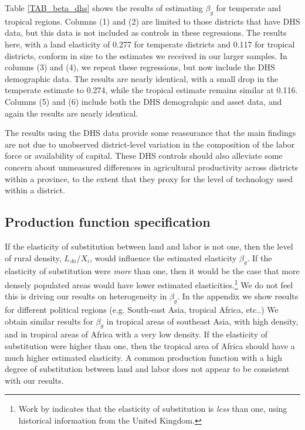 \documentclass[11pt]{article}
\begin{document}
Table \ref{TAB_beta_dhs} shows the results of estimating $\beta_g$ for temperate and tropical regions. Columns (1) and (2) are limited to those districts that have DHS data, but this data is not included as controls in these regressions. The results here, with a land elasticity of 0.277 for temperate districts and 0.117 for tropical districts, conform in size to the estimates we received in our larger samples. In columns (3) and (4), we repeat these regressions, but now include the DHS demographic data. The results are nearly identical, with a small drop in the temperate estimate to 0.274, while the tropical estimate remains similar at 0.116. Columns (5) and (6) include both the DHS demograhpic and asset data, and again the results are nearly identical. 

The results using the DHS data provide some reassurance that the main findings are not due to unobserved district-level variation in the composition of the labor force or availability of capital. These DHS controls should also alleviate some concern about unmeasured differences in agricultural productivity across districts within a province, to the extent that they proxy for the level of technology used within a district.

\subsection{Production function specification}
If the elasticity of substitution between land and labor is not one, then the level of rural density, $L_{Ai}/X_i$, would influence the estimated elasticity $\beta_g$. If the elasticity of substitution were \textit{more} than one, then it would be the case that more densely populated areas would have lower estimated elasticities.\footnote{Work by \citet{wilde2012} indicates that the elasticity of substitution is \textit{less} than one, using historical information from the United Kingdom.} We do not feel this is driving our results on heterogeneity in $\beta_g$. In the appendix we show results for different political regions (e.g. South-east Asia, tropical Africa, etc..) We obtain similar results for $\beta_g$ in tropical areas of southeast Asia, with high density, and in tropical areas of Africa with a very low density. If the elasticity of substitution were higher than one, then the tropical area of Africa should have a much higher estimated elasticity. A common production function with a high degree of substitution between land and labor does not appear to be consistent with our results.
\end{document}
